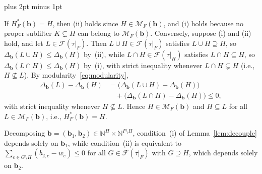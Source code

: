 \documentclass[11pt,letterpaper]{article}
\makeatletter
\renewenvironment{proof}[1][\proofname]{%
  \par\pushQED{\qed}\normalfont
  \topsep9pt plus 2pt minus 1pt\relax
  \trivlist\item[\hskip\labelsep\itshape #1\@addpunct{.}]\ignorespaces
}{\popQED\endtrivlist\@endpefalse}
\theoremstyle{result}
\theoremstyle{definition}
\theoremstyle{remark}
\newcommand{\NN}{\mathbb{N}}
\newcommand{\fF}{\mathcal{F}}
\newcommand{\mM}{\mathcal{M}}
\makeatother
\begin{document}
\begin{proof}
If $H^*_F(\mathbf{b})=H$, then (ii) holds since $H\in\mM_F(\mathbf{b})$, and (i) holds because no proper subfilter $K\subsetneq H$ can belong to $\mM_F(\mathbf{b})$. Conversely, suppose (i) and (ii) hold, and let $L\in\fF(\tau|_F)$. Then $L\cup H\in\fF(\tau|_F)$ satisfies $L\cup H\supseteq H$, so $\Delta_{\mathbf{b}}(L\cup H)\le\Delta_{\mathbf{b}}(H)$ by~(ii), while $L\cap H\in\fF(\tau|_H)$ satisfies $L\cap H\subseteq H$, so $\Delta_{\mathbf{b}}(L\cap H)\le\Delta_{\mathbf{b}}(H)$ by~(i), with strict inequality whenever $L\cap H\subsetneq H$ (i.e., $H\not\subseteq L$). By modularity~\eqref{eq:modularity},
\[
\begin{aligned}
\Delta_{\mathbf{b}}(L)-\Delta_{\mathbf{b}}(H)
  &= \bigl(\Delta_{\mathbf{b}}(L\cup H)-\Delta_{\mathbf{b}}(H)\bigr)\\
  &\quad + \bigl(\Delta_{\mathbf{b}}(L\cap H)-\Delta_{\mathbf{b}}(H)\bigr)
   \le 0,
\end{aligned}
\]
with strict inequality whenever $H\not\subseteq L$. Hence $H\in\mM_F(\mathbf{b})$ and $H\subseteq L$ for all $L\in\mM_F(\mathbf{b})$, i.e., $H^*_F(\mathbf{b})=H$.
\end{proof}

Decomposing $\mathbf{b}=(\mathbf{b}_1,\mathbf{b}_2)\in\NN^H\times\NN^{F\setminus H}$, condition~(i) of Lemma~\ref{lem:decouple} depends solely on $\mathbf{b}_1$, while condition~(ii) is equivalent to $\sum_{e\in G\setminus H}(b_{2,e}-w_e)\le 0$ for all $G\in\fF(\tau|_F)$ with $G\supseteq H$, which depends solely on $\mathbf{b}_2$.
\end{document}
